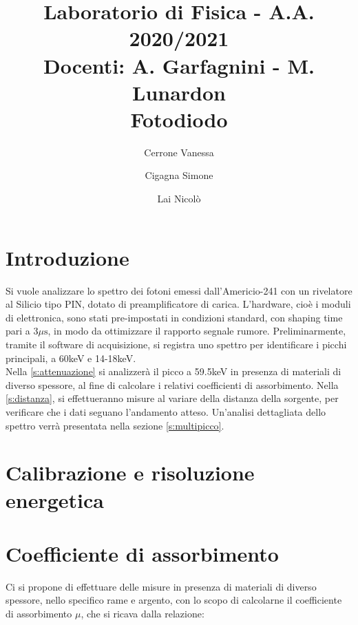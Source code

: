 \documentclass[twocolumn,10pt]{asme2ej}
\date{}
\title{{\huge\bfseries Laboratorio di Fisica} - {\LARGE A.A. 2020/2021} \\ 
    {\LARGE Docenti: A. Garfagnini - M. Lunardon} \\ {\Huge\bfseries Fotodiodo}}
\author{Cerrone Vanessa
    \affiliation{
    1200361\\
    vanessa.cerrone@studenti.unipd.it
    }	
}
\author{Cigagna Simone
    \affiliation{
	1193992\\
    simone.cigagna@studenti.unipd.it
    }	
}
\author{Lai Nicolò
    \affiliation{
	1193976\\
    nicolo.lai@studenti.unipd.it
    }	
}
\begin{document}
\maketitle    


\section{Introduzione}\label{s:introduzione}
Si vuole analizzare lo spettro dei fotoni emessi dall'Americio-241 con un rivelatore al Silicio tipo PIN,
dotato di preamplificatore di carica. L’hardware, cioè i moduli di elettronica, sono stati pre-impostati
in condizioni standard, con shaping time pari a $3\mu\si{\second}$, in modo da ottimizzare il rapporto
segnale rumore. Preliminarmente, tramite il software di acquisizione, si registra uno spettro per 
identificare i picchi principali, a 60keV e 14-18keV. \\
Nella \autoref{s:attenuazione} si analizzerà il picco a 59.5keV in presenza di materiali di diverso spessore,
al fine di calcolare i relativi coefficienti di assorbimento. Nella  \autoref{s:distanza}, si effettueranno 
misure al variare della distanza della sorgente, per verificare che i dati seguano l'andamento atteso. 
Un'analisi dettagliata dello spettro verrà presentata nella sezione \autoref{s:multipicco}. 




\section{Calibrazione e risoluzione energetica}\label{s:calibrazione}


\section{Coefficiente di assorbimento}\label{s:attenuazione}
Ci si propone di effettuare delle misure in presenza di materiali di diverso spessore, nello specifico
rame e argento, con lo scopo di calcolarne il coefficiente di assorbimento $\mu$, che si ricava dalla relazione:
\end{document}
